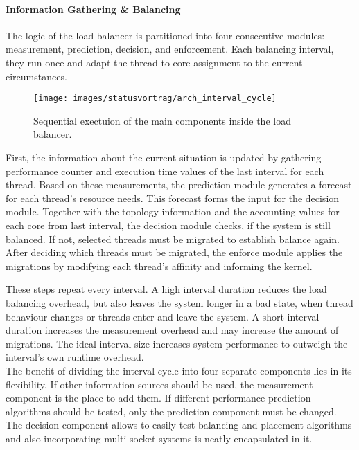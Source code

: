 \paragraph{Information Gathering \& Balancing}
The logic of the load balancer is partitioned into four consecutive modules:
measurement, prediction, decision, and enforcement.
Each balancing interval, they run once and adapt the thread to core
assignment to the current circumstances.

\begin{figure}[h]
  \centering
  \texttt{[image: images/statusvortrag/arch\_interval\_cycle]}
  \caption{Sequential exectuion of the main components inside the load
  balancer.}
  \label{arch:fig:intervalcycle}
\end{figure}

First, the information about the current situation is updated by gathering
performance counter and execution time values of the last interval for each
thread.
Based on these measurements, the prediction module generates a forecast for
each thread's resource needs.
This forecast forms the input for the decision module.
Together with the topology information and the accounting values for each core
from last interval, the decision module checks, if the system is still balanced.
If not, selected threads must be migrated to establish balance again.
After deciding which threads must be migrated, the enforce module applies the
migrations by modifying each thread's affinity and informing the kernel.

These steps repeat every interval. A high interval duration reduces the
load balancing overhead, but also leaves the system longer in a bad state, when
thread behaviour changes or threads enter and leave the system.
A short interval duration increases the measurement overhead and may increase
the amount of migrations.
The ideal interval size increases system performance to outweigh the interval's
own runtime overhead.
\\

The benefit of dividing the interval cycle into four separate components lies
in its flexibility.
If other information sources should be used, the measurement component is the
place to add them.
If different performance prediction algorithms should be tested, only the
prediction component must be changed.
The decision component allows to easily test balancing and placement algorithms
and also incorporating multi socket systems is neatly encapsulated in it.

